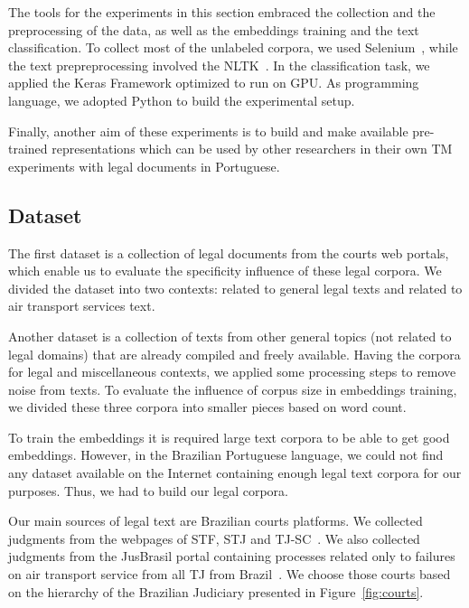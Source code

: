 The tools for the experiments in this section embraced the collection and the preprocessing of the data, as well as the embeddings training and the text classification. To collect most of the unlabeled corpora, we used Selenium~\cite{Salunke2014}, while the text prepreprocessing involved the \gls{NLTK}~\cite{Loper02}. In the classification task, we applied the Keras Framework optimized to run on \gls{GPU}.   As programming language, we adopted Python  to build the experimental setup.


Finally, another aim of these experiments is to build and make available pre-trained representations which can be used by other researchers in their own \gls{TM} experiments with legal documents in Portuguese.



\subsection{Dataset} \label{sec:embedding_dataset}





The first dataset is a collection of legal documents from the courts web portals, which  enable us to evaluate the specificity influence of these legal corpora. We divided the dataset into two contexts: related to general legal texts and related to air transport services text.

Another dataset is a collection of texts from other general topics (not related to legal domains) that are already compiled and freely available. Having the corpora for legal and miscellaneous contexts, we applied some processing steps to remove noise from texts. To evaluate the influence of corpus size in embeddings training, we divided these three corpora into smaller pieces based on word count.

To train the embeddings it is required large text corpora to be able to get good embeddings. However, in the Brazilian Portuguese language, we could not find any dataset available on the Internet containing enough legal text corpora for our purposes. Thus, we had to build our legal corpora.

Our main sources of legal text are Brazilian courts platforms. We collected judgments from the webpages of \gls{STF}, \gls{STJ} and \gls{TJ-SC}~\cite{STF2020, STJ2020, TJSC2020}. 
We also collected judgments from the JusBrasil portal containing processes related only to failures on air transport service from all \gls{TJ} from Brazil~\cite{Jusbrasil2020}. We choose those courts based on the hierarchy of the Brazilian Judiciary presented in Figure~\ref{fig:courts}.

